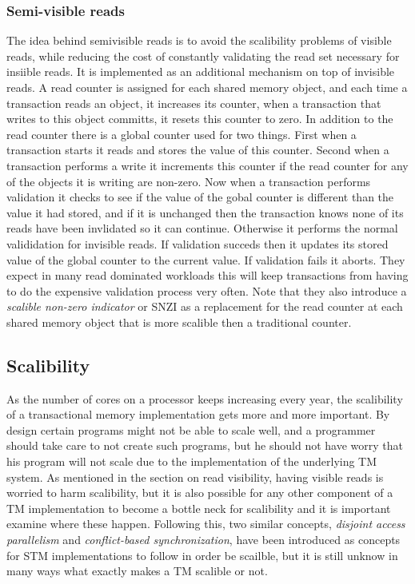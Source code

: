 \subsubsection{Semi-visible reads}
The idea behind semivisible reads \cite{lev:anatomy:transact:2009} is to avoid the scalibility problems of visible reads, while reducing the cost of constantly validating the read set necessary for insiible reads.
It is implemented as an additional mechanism on top of invisible reads.
A read counter is assigned for each shared memory object, and each time a transaction reads an object, it increases its counter, when a transaction that writes to this object committs, it resets this counter to zero.
In addition to the read counter there is a global counter used for two things. 
First when a transaction starts it reads and stores the value of this counter.
Second when a transaction performs a write it increments this counter if the read counter for any of the objects it is writing are non-zero.
Now when a transaction performs validation it checks to see if the value of the gobal counter is different than the value it had stored, and if it is unchanged then the transaction knows none of its reads have been invlidated so it can continue.
Otherwise it performs the normal valididation for invisible reads.
If validation succeds then it updates its stored value of the global counter to the current value.
If validation fails it aborts.
They expect in many read dominated workloads this will keep transactions from having to do the expensive validation process very often.
Note that they also introduce a \emph{scalible non-zero indicator} or SNZI as a replacement for the read counter at each shared memory object that is more scalible then a traditional counter.

\subsection{Scalibility}
As the number of cores on a processor keeps increasing every year, the scalibility of a transactional memory implementation gets more and more important.
By design certain programs might not be able to scale well, and a programmer should take care to not create such programs, but he should not have worry that his program will not scale due to the implementation of the underlying TM system.
As mentioned in the section on read visibility, having visible reads is worried to harm scalibility, but it is also possible for any other component of a TM implementation to become a bottle neck for scalibility and it is important examine where  these happen.
Following this, two similar concepts, \emph{disjoint access parallelism} and \emph{conflict-based synchronization}, have been introduced as concepts for STM implementations to follow in order be scailble, but it is still unknow in many ways what exactly makes a TM scalible or not.


